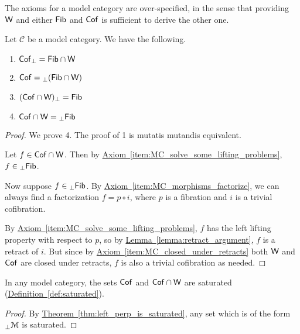 \documentclass[main.tex]{subfiles}
\begin{document}
The axioms for a model category are over-specified, in the sense that providing $\mathsf{W}$ and either $\mathsf{Fib}$ and $\mathsf{Cof}$ is sufficient to derive the other one.
\begin{lemma}
  \label{lemma:relations_between_lifting_properties_and_fibrations}
  Let $\mathcal{C}$ be a model category. We have the following.
  \begin{enumerate}
    \item $\mathsf{Cof}_{\perp} = \mathsf{Fib} \cap \mathsf{W}$
    \item $\mathsf{Cof} = {}_{\perp}(\mathsf{Fib} \cap \mathsf{W})$
    \item $(\mathsf{Cof} \cap \mathsf{W})_{\perp} = \mathsf{Fib}$
    \item $\mathsf{Cof} \cap \mathsf{W} = {}_{\perp}\mathsf{Fib}$
  \end{enumerate}
\end{lemma}
\begin{proof}
  We prove 4. The proof of 1 is mutatis mutandis equivalent.

  Let $f \in \mathsf{Cof} \cap \mathsf{W}$. Then by \hyperref[item:MC_solve_some_lifting_problems]{Axiom~\ref*{item:MC_solve_some_lifting_problems}}, $f \in {}_{\perp}\mathsf{Fib}$.

  Now suppose $f \in {}_{\perp}\mathsf{Fib}$. By \hyperref[item:MC_morphisms_factorize]{Axiom~\ref*{item:MC_morphisms_factorize}}, we can always find a factorization $f = p \circ i$, where $p$ is a fibration and $i$ is a trivial cofibration.

  By \hyperref[item:MC_solve_some_lifting_problems]{Axiom~\ref*{item:MC_solve_some_lifting_problems}}, $f$ has the left lifting property with respect to $p$, so by \hyperref[lemma:retract_argument]{Lemma~\ref*{lemma:retract_argument}}, $f$ is a retract of $i$. But since by \hyperref[item:MC_closed_under_retracts]{Axiom~\ref*{item:MC_closed_under_retracts}} both $\mathsf{W}$ and $\mathsf{Cof}$ are closed under retracts, $f$ is also a trivial cofibration as needed.
\end{proof}

\begin{corollary}
  \label{cor:trivial_fibrations_and_cofibrations_are_saturated}
  In any model category, the sets $\mathsf{Cof}$ and $\mathsf{Cof} \cap \mathsf{W}$ are saturated (\hyperref[def:saturated]{Definition~\ref*{def:saturated}}).
\end{corollary}
\begin{proof}
  By \hyperref[thm:left_perp_is_saturated]{Theorem~\ref*{thm:left_perp_is_saturated}}, any set which is of the form ${}_{\perp} \mathcal{M}$ is saturated.
\end{proof}
\end{document}
